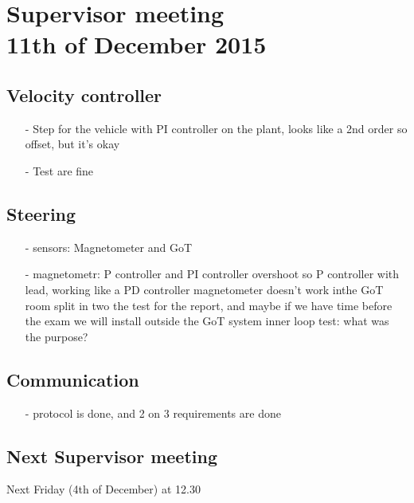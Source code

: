 

\renewcommand\chaptername{KAPITEL}
\renewcommand\contentsname{Indhold}
\renewcommand\figurename{Figur}
\renewcommand\tablename{Tabel}

\section*{Supervisor meeting\\ \small 11th of December 2015}

\subsection{Velocity controller}
\begin{itemize}
\item[-] Step for the vehicle with PI controller on the plant, looks like a 2nd order so offset, but it's okay
\item[-] Test are fine
\end{itemize}

\subsection{Steering}
\begin{itemize}
\item[-] sensors: Magnetometer and GoT 
\item[-] magnetometr: P controller and PI controller overshoot so P controller with lead, working like a PD controller
magnetometer doesn't work inthe GoT room
split in two the test for the report, and maybe if we have time before the exam we will install outside the GoT system
inner loop test: what was the purpose?
\end{itemize}


\subsection{Communication}
\begin{itemize}
\item[-] protocol is done, and 2 on 3 requirements are done
\end{itemize}


\subsection{Next Supervisor meeting}
Next Friday (4th of December) at 12.30



